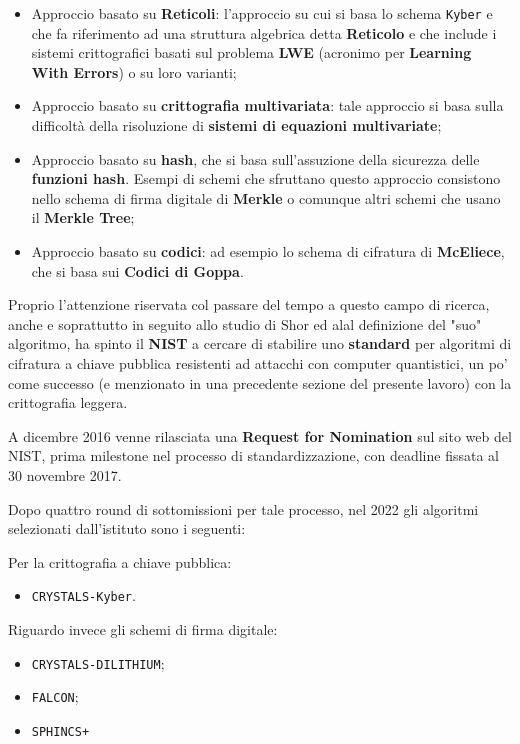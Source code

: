 \documentclass[a4paper, 12pt, oneside]{article}
\theoremstyle{definition}
\begin{document}
\begin{itemize}
    \item Approccio basato su \textbf{Reticoli}: l'approccio su cui si basa lo schema \texttt{Kyber} e che fa riferimento ad una struttura algebrica detta \textbf{Reticolo} e che include i sistemi crittografici basati sul problema \textbf{LWE} (acronimo per \textbf{Learning With Errors}) o su loro varianti;
    \item Approccio basato su \textbf{crittografia multivariata}: tale approccio si basa sulla difficoltà della risoluzione di \textbf{sistemi di equazioni multivariate};
    \item Approccio basato su \textbf{hash}, che si basa sull'assuzione della sicurezza delle \textbf{funzioni hash}. Esempi di schemi che sfruttano questo approccio consistono nello schema di firma digitale di \textbf{Merkle} o comunque altri schemi che usano il \textbf{Merkle Tree};
    \item Approccio basato su \textbf{codici}: ad esempio lo schema di cifratura di \textbf{McEliece}, che si basa sui \textbf{Codici di Goppa}.
\end{itemize}

Proprio l'attenzione riservata col passare del tempo a questo campo di ricerca, anche e soprattutto in seguito allo studio di Shor ed alal definizione del "suo" algoritmo, ha spinto il \textbf{NIST} a cercare di stabilire uno \textbf{standard} per algoritmi di cifratura a chiave pubblica resistenti ad attacchi con computer quantistici, un po' come successo (e menzionato in una precedente sezione del presente lavoro) con la crittografia leggera. 

A dicembre 2016 \cite{nist-pqc-nomination} venne rilasciata una \textbf{Request for Nomination} sul sito web del NIST, prima milestone nel processo di standardizzazione, con deadline fissata al 30 novembre 2017. 

Dopo quattro round di sottomissioni per tale processo, nel 2022 gli algoritmi selezionati dall'istituto sono i seguenti:

Per la crittografia a chiave pubblica:

\begin{itemize}
    \item \texttt{CRYSTALS-Kyber}.
\end{itemize}

Riguardo invece gli schemi di firma digitale:

\begin{itemize}
    \item \texttt{CRYSTALS-DILITHIUM};
    \item \texttt{FALCON};
    \item \texttt{SPHINCS+}
\end{itemize}
\end{document}
